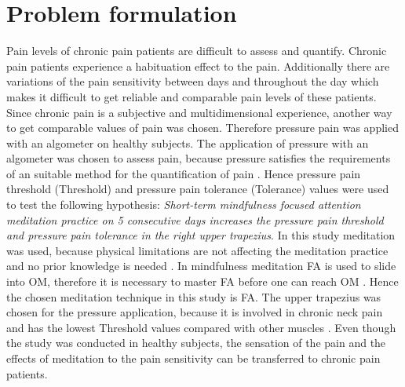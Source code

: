 \chapter{Problem formulation}

Pain levels of chronic pain patients are difficult to assess and quantify. Chronic pain patients experience a habituation effect to the pain. Additionally there are variations of the pain sensitivity between days and throughout the day which makes it difficult to get reliable and comparable pain levels of these patients. Since chronic pain is a subjective and multidimensional experience, another way to get comparable values of pain was chosen. Therefore pressure pain was applied with an algometer on healthy subjects. The application of pressure with an algometer was chosen to assess pain, because pressure satisfies the requirements of an suitable method for the quantification of pain \cite{Keele1954}. Hence pressure pain threshold (Threshold) and pressure pain tolerance (Tolerance) values were used to test the following hypothesis:
\textit{Short-term mindfulness focused attention meditation practice on 5 consecutive days increases the pressure pain threshold and pressure pain tolerance in the right upper trapezius}. In this study meditation was used, because physical limitations are not affecting the meditation practice and no prior knowledge is needed \cite{Tang2017}. In mindfulness meditation FA is used to slide into OM, therefore it is necessary to master FA before one can reach OM \cite{Perlman2016, Zeidan2016,Kabat1982}. Hence the chosen meditation technique in this study is FA. The upper trapezius was chosen for the pressure application, because it is involved in chronic neck pain and has the lowest Threshold values compared with other muscles \cite{Falla2004,Fischer1987}. Even though the study was conducted in healthy subjects, the sensation of the pain and the effects of meditation to the pain sensitivity can be transferred to chronic pain patients.



